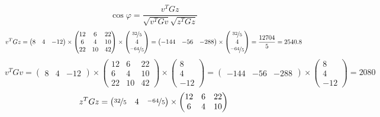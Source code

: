 \documentclass{article}
\begin{document}
\begin{center}
    $$\cos\varphi = \frac{v^{T}Gz}{\sqrt{v^{T}Gv}\sqrt{z^{T}Gz}}$$
    $$v^TGz = \begin{pmatrix}
            8 & 4 & -12
        \end{pmatrix}\times\begin{pmatrix}
            12 & 6  & 22 \\
            6  & 4  & 10 \\
            22 & 10 & 42
        \end{pmatrix}\times\begin{pmatrix}
            \nicefrac{32}{5} \\ 4 \\ \nicefrac{-64}{5}
        \end{pmatrix} = \begin{pmatrix}
            -144 & -56 & -288
        \end{pmatrix}\times\begin{pmatrix}
            \nicefrac{32}{5} \\ 4 \\ \nicefrac{-64}{5}
        \end{pmatrix} = \frac{12704}{5} = 2540.8$$
    $$v^TGv = \begin{pmatrix}
            8 & 4 & -12
        \end{pmatrix}\times\begin{pmatrix}
            12 & 6  & 22 \\
            6  & 4  & 10 \\
            22 & 10 & 42
        \end{pmatrix}\times\begin{pmatrix}
            8 \\ 4 \\ -12
        \end{pmatrix} = \begin{pmatrix}
            -144 & -56 & -288
        \end{pmatrix}\times\begin{pmatrix}
            8 \\ 4 \\ -12
        \end{pmatrix} = 2080$$
    $$z^TGz = \begin{pmatrix}
            \nicefrac{32}{5} & 4 & \nicefrac{-64}{5}
        \end{pmatrix}\times\begin{pmatrix}
            12 & 6  & 22 \\
            6  & 4  & 10 \\

\end{pmatrix}$$
\end{center}
\end{document}
